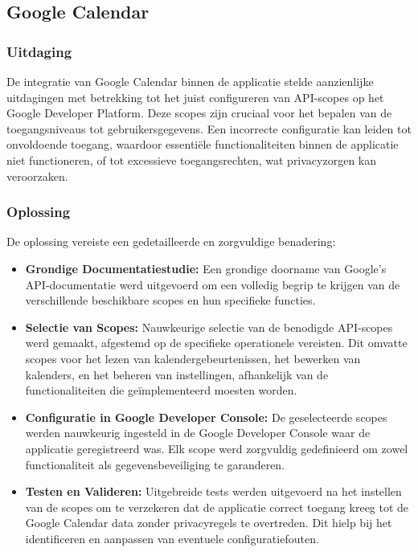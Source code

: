 \subsection{Google Calendar}

\subsubsection{Uitdaging}
De integratie van Google Calendar binnen de applicatie stelde aanzienlijke uitdagingen met betrekking tot het juist configureren van API-scopes op het Google Developer Platform. Deze scopes zijn cruciaal voor het bepalen van de toegangsniveaus tot gebruikersgegevens. Een incorrecte configuratie kan leiden tot onvoldoende toegang, waardoor essentiële functionaliteiten binnen de applicatie niet functioneren, of tot excessieve toegangsrechten, wat privacyzorgen kan veroorzaken.

\subsubsection{Oplossing}
De oplossing vereiste een gedetailleerde en zorgvuldige benadering:
\begin{itemize}
    \item \textbf{Grondige Documentatiestudie:} Een grondige doorname van Google's API-documentatie werd uitgevoerd om een volledig begrip te krijgen van de verschillende beschikbare scopes en hun specifieke functies.
    \item \textbf{Selectie van Scopes:} Nauwkeurige selectie van de benodigde API-scopes werd gemaakt, afgestemd op de specifieke operationele vereisten. Dit omvatte scopes voor het lezen van kalendergebeurtenissen, het bewerken van kalenders, en het beheren van instellingen, afhankelijk van de functionaliteiten die geïmplementeerd moesten worden.
    \item \textbf{Configuratie in Google Developer Console:} De geselecteerde scopes werden nauwkeurig ingesteld in de Google Developer Console waar de applicatie geregistreerd was. Elk scope werd zorgvuldig gedefinieerd om zowel functionaliteit als gegevensbeveiliging te garanderen.
    \item \textbf{Testen en Valideren:} Uitgebreide tests werden uitgevoerd na het instellen van de scopes om te verzekeren dat de applicatie correct toegang kreeg tot de Google Calendar data zonder privacyregels te overtreden. Dit hielp bij het identificeren en aanpassen van eventuele configuratiefouten.
\end{itemize}


